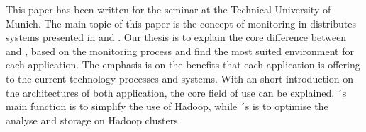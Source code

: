 
This paper has been written for the seminar \isdslong at the Technical University of Munich. The main topic of this paper is the concept of monitoring in distributes systems presented in \ambshort and \chukshort. Our thesis is to explain the core difference between \ambshort and \chukshort, based on the monitoring process and find the most suited environment for each application. The emphasis is on the benefits that each application is offering to the current technology processes and systems. With an short introduction on the architectures of both application, the core field of use can be explained. \ambshort´s main function is to simplify the use of Hadoop, while \chukshort´s is to optimise the analyse and storage on Hadoop clusters. 
